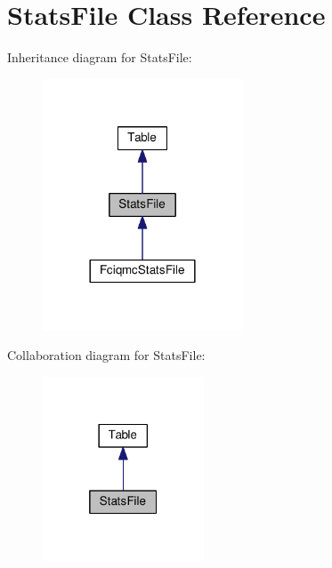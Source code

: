\hypertarget{classStatsFile}{}\section{Stats\+File Class Reference}
\label{classStatsFile}


Inheritance diagram for Stats\+File\+:
\nopagebreak
\begin{figure}[H]
\begin{center}
\leavevmode
\includegraphics[width=168pt]{classStatsFile__inherit__graph}
\end{center}
\end{figure}


Collaboration diagram for Stats\+File\+:
\nopagebreak
\begin{figure}[H]
\begin{center}
\leavevmode
\includegraphics[width=136pt]{classStatsFile__coll__graph}
\end{center}
\end{figure}

